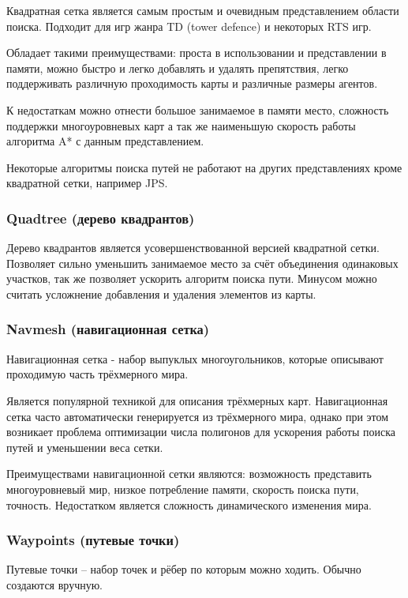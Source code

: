 Квадратная сетка является самым простым и очевидным представлением области поиска. Подходит для игр жанра TD (tower defence) и некоторых RTS игр. 

Обладает такими преимуществами: проста в использовании и представлении в памяти, можно быстро и легко добавлять и удалять препятствия, легко поддерживать различную проходимость карты и различные размеры агентов. 

К недостаткам можно отнести большое занимаемое в памяти место, сложность поддержки многоуровневых карт а так же наименьшую скорость работы алгоритма A* с данным представлением. 

Некоторые алгоритмы поиска путей не работают на других представлениях кроме квадратной сетки, например JPS.

\subsubsection{Quadtree (дерево квадрантов)}

Дерево квадрантов является усовершенствованной версией квадратной сетки. Позволяет сильно уменьшить занимаемое место за счёт объединения одинаковых участков, так же позволяет ускорить алгоритм поиска пути. Минусом можно считать усложнение добавления и удаления элементов из карты.

\subsubsection{Navmesh (навигационная сетка)}

Навигационная сетка - набор выпуклых многоугольников, которые описывают проходимую часть трёхмерного мира. 

Является популярной техникой для описания трёхмерных карт. Навигационная сетка часто автоматически генерируется из трёхмерного мира, однако при этом возникает проблема оптимизации числа полигонов для ускорения работы поиска путей и уменьшении веса сетки.

Преимуществами навигационной сетки являются: возможность представить многоуровневый мир, низкое потребление памяти, скорость поиска пути, точность. Недостатком является сложность динамического изменения мира.

\subsubsection{Waypoints (путевые точки)}

Путевые точки -- набор точек и рёбер по которым можно ходить. Обычно создаются вручную.

